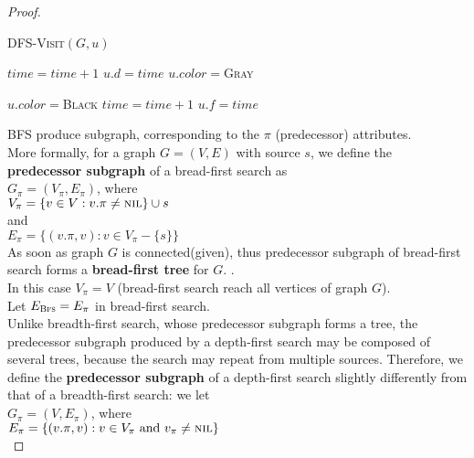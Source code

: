 \documentclass{article}
\let\oldnl\nl
\newcommand{\nonl}{\renewcommand{\nl}{\let\nl\oldnl}}
\begin{document}
\begin{proof}
\begin{multicols}{2}
\begin{algorithm}[H]
  \SetAlgoNoEnd\SetAlgoNoLine
  \SetNlSkip{1.5em}
  \DontPrintSemicolon

  \nonl \textsc{DFS-Visit}$(G,u)$

  $time = time + 1$\;
  $u.d = time$\;
  $u.color = $\textsc{Gray}\;

  $u.color = $\textsc{Black}\;
  $time = time + 1$\;
  $u.f = time$\;
\end{algorithm}

\end{multicols}


BFS produce subgraph, corresponding to the $\pi$ (predecessor) attributes.\\
More formally, for a graph $G=(V,E)$ with source $s$,
we define the \textbf{predecessor subgraph} of a bread-first search as\\

$G_\pi = (V_\pi, E_\pi)$, where\\
$V_\pi = \{v \in V: v.\pi \neq \textsc{nil}\} \cup {s}$\\
and\\
$E_\pi = \{(v.\pi,v) : v \in V_\pi - \{s\}\}$\\

As soon as graph $G$ is connected(given), thus predecessor subgraph of
bread-first search forms a \textbf{bread-first tree} for $G$.
\cite[by Lemma 22.6][page 601]{introtoalg}.\\

In this case $V_\pi = V$ (bread-first search reach all vertices of graph $G$).\\

Let $E_\textsc{Bfs} = E_\pi$ in bread-first search.\\

Unlike breadth-first search, whose predecessor subgraph forms a tree, the
predecessor subgraph produced by a depth-first search may be composed of several
trees, because the search may repeat from multiple sources. Therefore, we define
the \textbf{predecessor subgraph} of a depth-first search slightly differently from that
of a breadth-first search: we let\\

$G_\pi = (V, E_\pi)$, where\\
$E_\pi = \{(v.\pi,v) : v \in V_\pi \text{ and } v_\pi \neq \textsc{nil}\}$\\


\end{proof}
\end{document}
